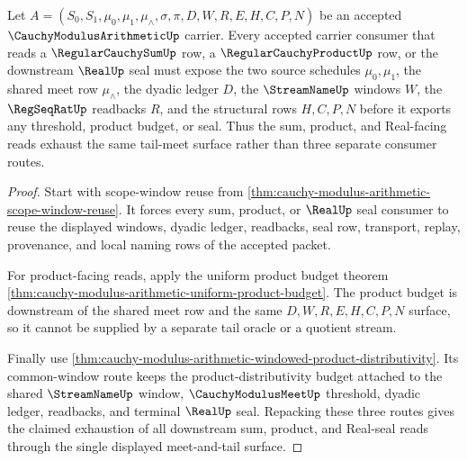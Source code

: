 \begin{theorem}
\label{thm:cauchy-modulus-arithmetic-tail-meet-exhaustion}
Let $A=(S_0,S_1,\mu_0,\mu_1,\mu_{\wedge},\sigma,\pi,D,W,R,E,H,C,P,N)$ be an accepted $\CauchyModulusArithmeticUp$ carrier. Every accepted carrier consumer that reads a $\RegularCauchySumUp$ row, a $\RegularCauchyProductUp$ row, or the downstream $\RealUp$ seal must expose the two source schedules $\mu_0,\mu_1$, the shared meet row $\mu_{\wedge}$, the dyadic ledger $D$, the $\StreamNameUp$ windows $W$, the $\RegSeqRatUp$ readbacks $R$, and the structural rows $H,C,P,N$ before it exports any threshold, product budget, or seal. Thus the sum, product, and Real-facing reads exhaust the same tail-meet surface rather than three separate consumer routes.
\end{theorem}
\begin{proof}
Start with scope-window reuse from \autoref{thm:cauchy-modulus-arithmetic-scope-window-reuse}. It forces every sum, product, or $\RealUp$ seal consumer to reuse the displayed windows, dyadic ledger, readbacks, seal row, transport, replay, provenance, and local naming rows of the accepted packet.

For product-facing reads, apply the uniform product budget theorem \autoref{thm:cauchy-modulus-arithmetic-uniform-product-budget}. The product budget is downstream of the shared meet row and the same $D,W,R,E,H,C,P,N$ surface, so it cannot be supplied by a separate tail oracle or a quotient stream.

Finally use \autoref{thm:cauchy-modulus-arithmetic-windowed-product-distributivity}. Its common-window route keeps the product-distributivity budget attached to the shared $\StreamNameUp$ window, $\CauchyModulusMeetUp$ threshold, dyadic ledger, readbacks, and terminal $\RealUp$ seal. Repacking these three routes gives the claimed exhaustion of all downstream sum, product, and Real-seal reads through the single displayed meet-and-tail surface.
\end{proof}



